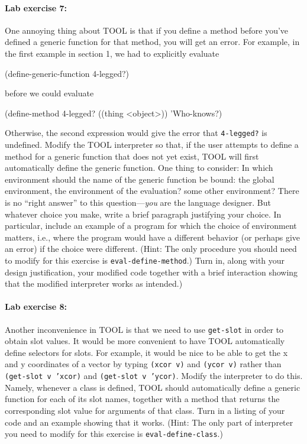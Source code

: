 \paragraph{Lab exercise 7:}  One annoying thing about TOOL is that if
you define a method before you've defined a generic function for that
method, you will get an error.  For example, in the first example
in section 1, we had to explicitly evaluate

\beginlisp
(define-generic-function 4-legged?)
\endlisp

\noindent before we could evaluate

\beginlisp
(define-method 4-legged? ((thing <object>))
  'Who-knows?)
\endlisp

\noindent Otherwise, the second expression would give the error that
{\tt 4-legged?} is undefined.  Modify the TOOL interpreter so that,
if the user attempts to define a method for a generic function that
does not yet exist, TOOL will first automatically define the generic
function.  One thing to consider: In which environment should the
name of the generic function be bound: the global environment, the
environment of the evaluation?  some other environment?  There is no
``right answer'' to this question---{\it you} are the language
designer.  But whatever choice you make, write a brief paragraph
justifying your choice.  In particular, include an example of a
program for which the choice of environment matters, i.e., where the
program would have a different behavior (or perhaps give an error) if
the choice were different.  (Hint: The only procedure you should need
to modify for this exercise is {\tt eval-define-method}.)  Turn in,
along with your design justification, your modified code together
with a brief interaction showing that the modified interpreter works
as intended.)

\paragraph{Lab exercise 8:} Another inconvenience in TOOL is that we
need to use {\tt get-slot} in order to obtain slot values.  It would
be more convenient to have TOOL automatically define selectors for
slots.  For example, it would be nice to be able to get the x and y
coordinates of a vector by typing {\tt (xcor v)} and {\tt (ycor v)}
rather than {\tt (get-slot v 'xcor)} and {\tt (get-slot v 'ycor)}.
Modify the interpreter to do this.  Namely, whenever a class is
defined, TOOL should automatically define a generic function for each
of its slot names, together with a method that returns the
corresponding slot value for arguments of that class.  Turn in a
listing of your code and an example showing that it works.  (Hint:
The only part of interpreter you need to modify for this exercise is
{\tt eval-define-class}.)

